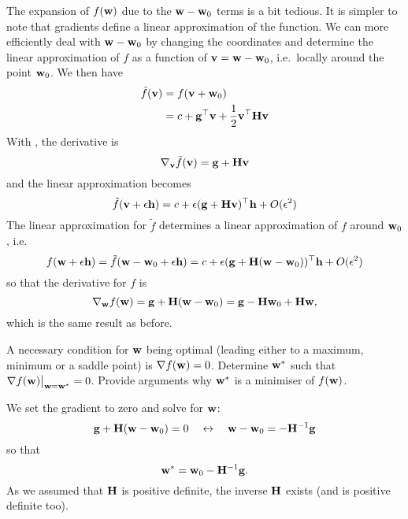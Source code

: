 \begin{exenumerate}
\begin{solution}
    The expansion of $f(\mathbf{w})$ due to the $\mathbf{w}-\mathbf{w}_0$ terms is a bit
    tedious. It is simpler to note that gradients define a linear approximation
    of the function. We can more efficiently deal with $\mathbf{w}-\mathbf{w}_0$ by changing the
    coordinates and determine the linear approximation of $f$ as a function of
    $\mathbf{v} = \mathbf{w}-\mathbf{w}_0$, i.e.\ locally around the point $\mathbf{w}_0$. We then have
    \begin{align}
      \tilde{f}(\mathbf{v}) & = f(\mathbf{v}+\mathbf{w}_0)\\
                    & = c + \mathbf{g}^\top \mathbf{v} + \frac{1}{2} \mathbf{v}^\top \mathbf{H} \mathbf{v}
    \end{align}
    With , the derivative is
    \begin{equation}
      \nabla_{\mathbf{v}} \tilde{f}(\mathbf{v}) = \mathbf{g} + \mathbf{H} \mathbf{v}
    \end{equation}
    and the linear approximation becomes
    \begin{equation}
      \tilde{f}(\mathbf{v}+\epsilon \mathbf{h}) =  c + \epsilon (\mathbf{g} + \mathbf{H} \mathbf{v})^\top \mathbf{h} + O(\epsilon^2)
    \end{equation}
    The linear approximation for $\tilde{f}$ determines a linear approximation of $f$ around $\mathbf{w}_0$, i.e.\
    \begin{equation}
      f(\mathbf{w} + \epsilon \mathbf{h}) =  \tilde{f}(\mathbf{w}-\mathbf{w}_0+\epsilon \mathbf{h}) =  c + \epsilon (\mathbf{g} + \mathbf{H} (\mathbf{w}-\mathbf{w}_0))^\top \mathbf{h} + O(\epsilon^2)
    \end{equation}
    so that the derivative for $f$ is
    \begin{equation}
      \nabla_{\mathbf{w}}f(\mathbf{w}) = \mathbf{g} + \mathbf{H} (\mathbf{w}-\mathbf{w}_0) = \mathbf{g} - \mathbf{H} \mathbf{w}_0 + \mathbf{H} \mathbf{w},
    \end{equation}
    which is the same result as before.
  \end{solution}
  
\item A necessary condition for $\mathbf{w}$ being optimal (leading either to a maximum, minimum or a saddle point) is $\nabla f(\mathbf{w})=0$. 
  Determine $\mathbf{w}^\ast$ such that $\nabla f(\mathbf{w})\big|_{\mathbf{w}=\mathbf{w}^\ast}=0$. Provide arguments why $\mathbf{w}^\ast$ is a minimiser of $f(\mathbf{w})$.
  
  \begin{solution}
    We set the gradient to zero and solve for $\mathbf{w}$:
    \begin{equation}
        \mathbf{g} + \mathbf{H}(\mathbf{w} -\mathbf{w}_0) = 0 \quad \leftrightarrow \quad \mathbf{w}-\mathbf{w}_0 = - \mathbf{H}^{-1} \mathbf{g}
      \end{equation}
      so that
      \begin{equation}
        \mathbf{w}^\ast = \mathbf{w}_0 - \mathbf{H}^{-1} \mathbf{g}.
      \end{equation}
    As we assumed that $\mathbf{H}$ is positive definite, the inverse $\mathbf{H}$ exists (and
    is positive definite too).
    

\end{solution}
\end{exenumerate}
